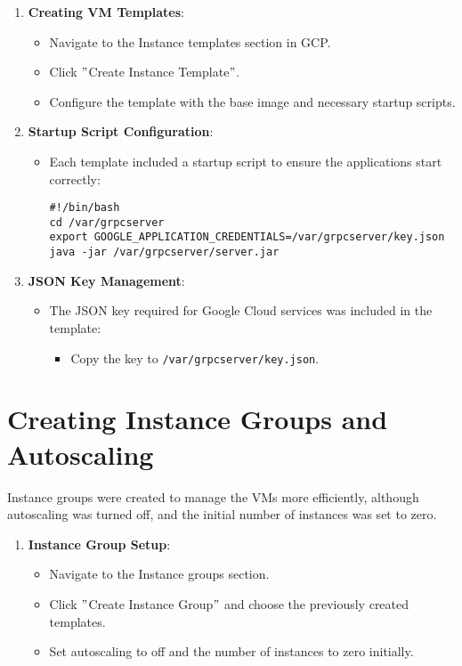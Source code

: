 \begin{enumerate}
    \item \textbf{Creating VM Templates}:
    \begin{itemize}
        \item Navigate to the Instance templates section in GCP.
        \item Click \("\)Create Instance Template\("\).
        \item Configure the template with the base image and necessary startup scripts.
    \end{itemize}

    \item \textbf{Startup Script Configuration}:
    \begin{itemize}
        \item Each template included a startup script to ensure the applications start correctly:
        \begin{verbatim}
#!/bin/bash
cd /var/grpcserver
export GOOGLE_APPLICATION_CREDENTIALS=/var/grpcserver/key.json
java -jar /var/grpcserver/server.jar
        \end{verbatim}
    \end{itemize}

    \item \textbf{JSON Key Management}:
    \begin{itemize}
        \item The JSON key required for Google Cloud services was included in the template:
        \begin{itemize}
            \item Copy the key to \texttt{/var/grpcserver/key.json}.
        \end{itemize}
    \end{itemize}
\end{enumerate}


\section{Creating Instance Groups and Autoscaling}\label{sec:creating-instance-groups-and-autoscaling}

Instance groups were created to manage the VMs more efficiently, although autoscaling was turned off, and the initial number of instances was set to zero.

\begin{enumerate}
    \item \textbf{Instance Group Setup}:
    \begin{itemize}
        \item Navigate to the Instance groups section.
        \item Click \("\)Create Instance Group\("\) and choose the previously created templates.
        \item Set autoscaling to off and the number of instances to zero initially.
    \end{itemize}
\end{enumerate}


